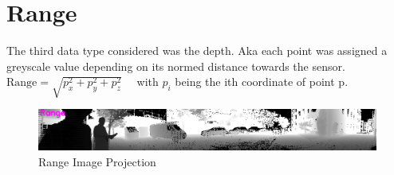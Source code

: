 \section{Range}{
    The third data type considered was the depth. Aka each point was assigned a greyscale value depending on its normed distance towards the sensor.\\
    $\text{Range} = \sqrt{p_x^2 + p_y^2 + p_z^2} \quad$ with $p_i$ being the ith coordinate of point p.

    \begin{figure}[h]
        \centering
        \includegraphics[scale=0.19]{images/dataset/range.png}
        \caption{Range Image Projection}
        \label{fig:range}
    \end{figure}

    
}